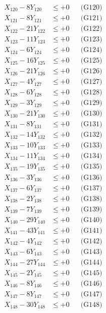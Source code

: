 \documentclass[a4paper,10pt]{article}
\begin{document}
{\begin{align}
X_{120} - 8Y_{120} &\leq +0 && \text{(G120)} \\
X_{121} - 8Y_{121} &\leq +0 && \text{(G121)} \\
X_{122} - 21Y_{122} &\leq +0 && \text{(G122)} \\
X_{123} - 11Y_{123} &\leq +0 && \text{(G123)} \\
\allowbreak
X_{124} - 6Y_{124} &\leq +0 && \text{(G124)} \\
X_{125} - 16Y_{125} &\leq +0 && \text{(G125)} \\
X_{126} - 21Y_{126} &\leq +0 && \text{(G126)} \\
X_{127} - 4Y_{127} &\leq +0 && \text{(G127)} \\
X_{128} - 6Y_{128} &\leq +0 && \text{(G128)} \\
X_{129} - 3Y_{129} &\leq +0 && \text{(G129)} \\
X_{130} - 21Y_{130} &\leq +0 && \text{(G130)} \\
X_{131} - 8Y_{131} &\leq +0 && \text{(G131)} \\
X_{132} - 14Y_{132} &\leq +0 && \text{(G132)} \\
X_{133} - 10Y_{133} &\leq +0 && \text{(G133)} \\
\allowbreak
X_{134} - 11Y_{134} &\leq +0 && \text{(G134)} \\
X_{135} - 19Y_{135} &\leq +0 && \text{(G135)} \\
X_{136} - 3Y_{136} &\leq +0 && \text{(G136)} \\
X_{137} - 6Y_{137} &\leq +0 && \text{(G137)} \\
X_{138} - 2Y_{138} &\leq +0 && \text{(G138)} \\
X_{139} - 7Y_{139} &\leq +0 && \text{(G139)} \\
X_{140} - 29Y_{140} &\leq +0 && \text{(G140)} \\
X_{141} - 43Y_{141} &\leq +0 && \text{(G141)} \\
X_{142} - 4Y_{142} &\leq +0 && \text{(G142)} \\
X_{143} - 6Y_{143} &\leq +0 && \text{(G143)} \\
\allowbreak
X_{144} - 27Y_{144} &\leq +0 && \text{(G144)} \\
X_{145} - 2Y_{145} &\leq +0 && \text{(G145)} \\
X_{146} - 8Y_{146} &\leq +0 && \text{(G146)} \\
X_{147} - 8Y_{147} &\leq +0 && \text{(G147)} \\
X_{148} - 30Y_{148} &\leq +0 && \text{(G148)} \\

\end{align}}
\end{document}
